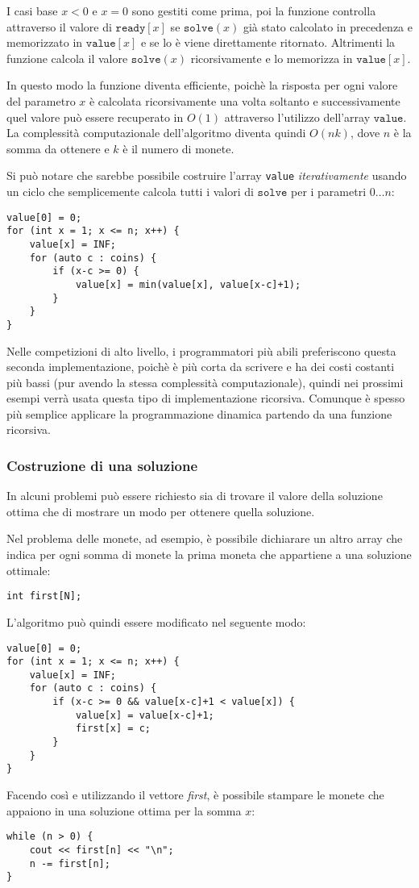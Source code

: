 I casi base $x<0$ e $x=0$ sono gestiti come prima,
poi la funzione controlla attraverso il valore di 
$\texttt{ready}[x]$ se
$\texttt{solve}(x)$ già stato calcolato in precedenza
e memorizzato in $\texttt{value}[x]$ e se lo è
viene direttamente ritornato.
Altrimenti la funzione calcola il valore
$\texttt{solve}(x)$ ricorsivamente e lo memorizza 
in $\texttt{value}[x]$.

In questo modo la funzione diventa efficiente,
poichè la risposta per ogni valore del parametro $x$
è calcolata ricorsivamente una volta soltanto e successivamente
quel valore può essere recuperato in $O(1)$ attraverso
l'utilizzo dell'array $\texttt{value}$.
La complessità computazionale dell'algoritmo diventa quindi $O(nk)$,
dove $n$ è la somma da ottenere e $k$ è il numero di monete.

Si può notare che sarebbe possibile 
costruire l'array \texttt{value} \emph{iterativamente}
usando un ciclo che semplicemente calcola tutti i 
valori di $\texttt{solve}$ per i parametri $0 \ldots n$:
\begin{lstlisting}
value[0] = 0;
for (int x = 1; x <= n; x++) {
    value[x] = INF;
    for (auto c : coins) {
        if (x-c >= 0) {
            value[x] = min(value[x], value[x-c]+1);
        }
    }
}
\end{lstlisting}

Nelle competizioni di alto livello, i programmatori
più abili preferiscono questa seconda implementazione,
poichè è più corta da scrivere e ha dei costi costanti più bassi
(pur avendo la stessa complessità computazionale),
quindi nei prossimi esempi verrà usata
questa tipo di implementazione ricorsiva.
Comunque è spesso più semplice applicare
la programmazione dinamica partendo 
da una funzione ricorsiva.

\subsubsection{Costruzione di una soluzione}

In alcuni problemi può essere richiesto sia
di trovare il valore della soluzione ottima
che di mostrare un modo per ottenere quella soluzione.

Nel problema delle monete, ad esempio, è possibile
dichiarare un altro array che indica per ogni
somma di monete la prima moneta che appartiene a 
una soluzione ottimale:
\begin{lstlisting}
int first[N];
\end{lstlisting}
L'algoritmo può quindi essere modificato nel seguente modo:
\begin{lstlisting}
value[0] = 0;
for (int x = 1; x <= n; x++) {
    value[x] = INF;
    for (auto c : coins) {
        if (x-c >= 0 && value[x-c]+1 < value[x]) {
            value[x] = value[x-c]+1;
            first[x] = c;
        }
    }
}
\end{lstlisting}
Facendo così e utilizzando il vettore \textit{first}, è
possibile stampare le monete che appaiono in una soluzione ottima
per la somma $x$:
\begin{lstlisting}
while (n > 0) {
    cout << first[n] << "\n";
    n -= first[n];
}
\end{lstlisting}

